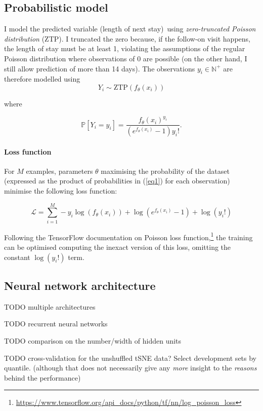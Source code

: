 \documentclass[10pt, twocolumn]{article}
\begin{document}
\subsection{Probabilistic model}

I model the predicted variable (length of next stay) using \textit{zero-truncated Poisson distribution} (ZTP). I truncated the zero because, if the follow-on visit happens, the length of stay must be at least 1, violating the assumptions of the regular Poisson distribution where observations of 0 are possible (on the other hand, I still allow prediction of more than 14 days). The observations $y_i \in \mathbb{N}^+$ are therefore modelled using \[Y_i \sim \mathrm{ZTP}(f_\theta(x_i))\]

where 

\begin{equation}
	\mathbb{P}[Y_i = y_i] = \frac{f_\theta(x_i)^{y_i}}{(e^{f_\theta(x_i)} - 1)y_i!}.
	\label{eq1}
\end{equation}

\paragraph{Loss function} For $M$ examples, parameters $\theta$ maximising the probability of the dataset (expressed as the product of probabilities in (\ref{eq1}) for each observation) minimise the following loss function:

\begin{equation}
	\mathcal{L} = \sum\limits_{i=1}^{M} -y_i \log(f_\theta(x_i)) + \log(e^{f_\theta(x_i)} - 1) + \log(y_i!)
\end{equation}

Following the TensorFlow documentation on Poisson loss function,\footnote{\url{https://www.tensorflow.org/api_docs/python/tf/nn/log_poisson_loss}} the training can be optimised computing the inexact version of this loss, omitting the constant $\log(y_i!)$ term.


\subsection{Neural network architecture}
TODO multiple architectures

TODO recurrent neural networks

TODO comparison on the number/width of hidden units 

TODO cross-validation for the unshuffled tSNE data? Select development sets by quantile. (although that does not necessarily give any \textit{more} insight to the \textit{reasons} behind the performance)
\end{document}
